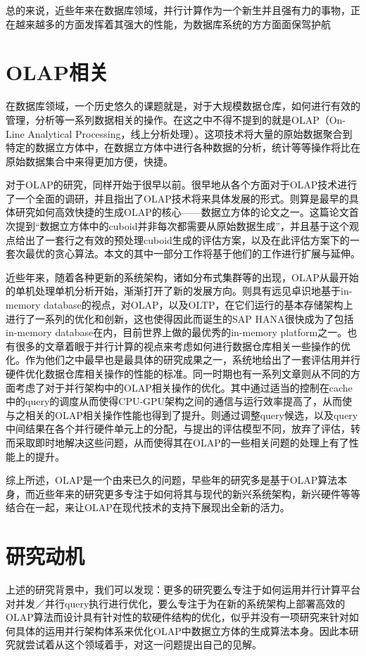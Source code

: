 总的来说，近些年来在数据库领域，并行计算作为一个新生并且强有力的事物，正在越来越多的方面发挥着其强大的性能，为数据库系统的方方面面保驾护航

\section{OLAP相关}
在数据库领域，一个历史悠久的课题就是，对于大规模数据仓库，如何进行有效的管理，分析等一系列数据相关的操作。在这之中不得不提到的就是OLAP（On-Line Analytical Processing，线上分析处理）。这项技术将大量的原始数据聚合到特定的数据立方体中，在数据立方体中进行各种数据的分析，统计等等操作将比在原始数据集合中来得更加方便，快捷。\cite{OLAP}

对于OLAP的研究，同样开始于很早以前。\cite{ChaudhuriSIGMOD1997}很早地从各个方面对于OLAP技术进行了一个全面的调研，并且指出了OLAP技术将来具体发展的形式。\cite{HarinarayanSIGMOD1996}则算是最早的具体研究如何高效快捷的生成OLAP的核心——数据立方体的论文之一。这篇论文首次提到“数据立方体中的cuboid并非每次都需要从原始数据生成”，并且基于这个观点给出了一套行之有效的预处理cuboid生成的评估方案，以及在此评估方案下的一套次最优的贪心算法。本文的其中一部分工作将基于他们的工作进行扩展与延伸。

近些年来，随着各种更新的系统架构，诸如分布式集群等的出现，OLAP从最开始的单机处理单机分析开始，渐渐打开了新的发展方向。\cite{PlattnerSIGMOD2009}则具有远见卓识地基于in-memory database的视点，对OLAP，以及OLTP，在它们运行的基本存储架构上进行了一系列的优化和创新，这也使得因此而诞生的SAP HANA\cite{SAPHANA}很快成为了包括in-memory database在内，目前世界上做的最优秀的in-memory platform之一。也有很多的文章着眼于并行计算的视点来考虑如何进行数据仓库相关一些操作的优化。\cite{yuanVLDB2013}作为他们之中最早也是最具体的研究成果之一，系统地给出了一套评估用并行硬件优化数据仓库相关操作的性能的标准。同一时期也有一系列文章则从不同的方面考虑了对于并行架构中的OLAP相关操作的优化。其中\cite{heVLDB2014}通过适当的控制在cache中的query的调度从而使得CPU-GPU架构之间的通信与运行效率提高了，从而使与之相关的OLAP相关操作性能也得到了提升。\cite{KarnagelVLDB2017}则通过调整query候选，以及query中间结果在各个并行硬件单元上的分配，与\cite{heACMTDS2009}提出的评估模型不同，放弃了评估，转而采取即时地解决这些问题，从而使得其在OLAP的一些相关问题的处理上有了性能上的提升。

综上所述，OLAP是一个由来已久的问题，早些年的研究多是基于OLAP算法本身，而近些年来的研究更多专注于如何将其与现代的新兴系统架构，新兴硬件等等结合在一起，来让OLAP在现代技术的支持下展现出全新的活力。


\section{研究动机}
上述的研究背景中，我们可以发现：更多的研究要么专注于如何运用并行计算平台对并发／并行query执行进行优化，要么专注于为在新的系统架构上部署高效的OLAP算法而设计具有针对性的软硬件结构的优化，似乎并没有一项研究来针对如何具体的运用并行架构体系来优化OLAP中数据立方体的生成算法本身。因此本研究就尝试着从这个领域着手，对这一问题提出自己的见解。

